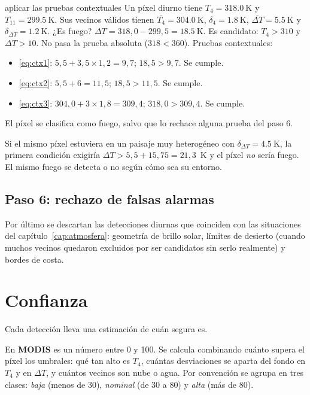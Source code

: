 \begin{ejemplo}{aplicar las pruebas contextuales}
Un píxel diurno tiene $T_4 = \SI{318.0}{\kelvin}$ y $T_{11} = \SI{299.5}{\kelvin}$. Sus vecinos
válidos tienen $\overline{T_4} = \SI{304.0}{\kelvin}$, $\delta_4 = \SI{1.8}{\kelvin}$,
$\overline{\Delta T} = \SI{5.5}{\kelvin}$ y $\delta_{\Delta T} = \SI{1.2}{\kelvin}$. ¿Es fuego?
\solucion $\Delta T = 318{,}0 - 299{,}5 = \SI{18.5}{\kelvin}$. Es candidato: $T_4 > 310$ y
$\Delta T > 10$. No pasa la prueba absoluta ($318 < 360$). Pruebas contextuales:
\begin{itemize}
  \item \eqref{eq:ctx1}: $5{,}5 + 3{,}5\times1{,}2 = 9{,}7$; $18{,}5 > 9{,}7$. Se cumple.
  \item \eqref{eq:ctx2}: $5{,}5 + 6 = 11{,}5$; $18{,}5 > 11{,}5$. Se cumple.
  \item \eqref{eq:ctx3}: $304{,}0 + 3\times1{,}8 = 309{,}4$; $318{,}0 > 309{,}4$. Se cumple.
\end{itemize}
El píxel se clasifica como fuego, salvo que lo rechace alguna prueba del paso 6.

Si el mismo píxel estuviera en un paisaje muy heterogéneo con $\delta_{\Delta T} =
\SI{4.5}{\kelvin}$, la primera condición exigiría $\Delta T > 5{,}5 + 15{,}75 = 21{,}3$~K y el
píxel \emph{no} sería fuego. El mismo fuego se detecta o no según cómo sea su entorno.
\end{ejemplo}

\subsection{Paso 6: rechazo de falsas alarmas}

Por último se descartan las detecciones diurnas que coinciden con las situaciones del
capítulo~\ref{cap:atmosfera}: geometría de brillo solar, límites de desierto (cuando muchos
vecinos quedaron excluidos por ser candidatos sin serlo realmente) y bordes de costa.

\section{Confianza}

Cada detección lleva una estimación de cuán segura es.

En \textbf{MODIS} es un número entre 0 y 100. Se calcula combinando cuánto supera el píxel los
umbrales: qué tan alto es $T_4$, cuántas desviaciones se aparta del fondo en $T_4$ y en
$\Delta T$, y cuántos vecinos son nube o agua. Por convención se agrupa en tres clases:
\emph{baja} (menos de 30), \emph{nominal} (de 30 a 80) y \emph{alta} (más de 80).

